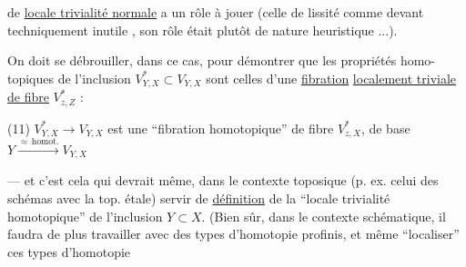 de \uline{locale trivialité normale} a un rôle
à jouer (celle de lissité  comme
devant techniquement inutile , son rôle
était plutôt de nature heuristique ...).

 On doit se débrouiller, dans ce cas,
pour démontrer que les propriétés homo-
topiques de l'inclusion $V^*_{Y,X}\subset V_{Y,X}$
sont celles d'une \uline{fibration}
\uline{localement triviale de fibre} $V^*_{z,Z}$ :

\noindent (11) $V^*_{Y,X}\longrightarrow V_{Y,X}$ est une ``fibration
homotopique'' de fibre $V^*_{z,X}$,
de base $Y\xrightarrow{\approx\,\mathrm{homot.}} V_{Y,X}$

--- et c'est cela qui devrait même,
dans le contexte toposique (p. ex. celui
des schémas avec la top. étale) servir
de \uline{définition} de la ``locale trivialité 
homotopique'' de l'inclusion $Y\subset X$.
(Bien sûr, dans le contexte schématique,
il faudra de plus travailler avec
des types d'homotopie profinis, et
même  ``localiser'' ces types d'homotopie
